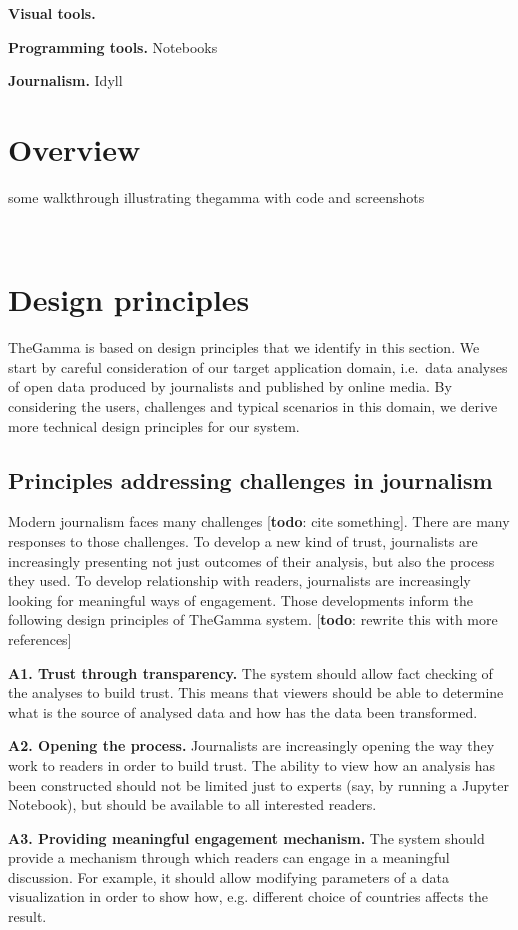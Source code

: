 \documentclass{sigchi}
\newcommand{\todo}[1]{\textcolor{todoColor}{[\textbf{todo}: #1]}}
\begin{document}
\textbf{Visual tools.}

\textbf{Programming tools.}
Notebooks

\textbf{Journalism.}
Idyll

\section{Overview}

some walkthrough illustrating thegamma with code and screenshots

\newpage
~
\newpage

\section{Design principles}
TheGamma is based on design principles that we identify in this section. We start by careful
consideration of our target application domain, i.e.~data analyses of open data produced by
journalists and published by online media. By considering the users, challenges and typical
scenarios in this domain, we derive more technical design principles for our system.

\subsection{Principles addressing challenges in journalism}
Modern journalism faces many challenges \todo{cite something}. There are many responses to those
challenges. To develop a new kind of trust, journalists are increasingly presenting not just
outcomes of their analysis, but also the process they used. To develop relationship with readers,
journalists are increasingly looking for meaningful ways of engagement. Those developments
inform the following design principles of TheGamma system. \todo{rewrite this with
more references}

\textbf{A1. Trust through transparency.} The system should allow fact checking of the analyses to
build trust. This means that viewers should be able to determine what is the source of analysed
data and how has the data been transformed.

\textbf{A2. Opening the process.} Journalists are increasingly opening the way they work
to readers in order to build trust. The ability to view how an analysis has been constructed should
not be limited just to experts (say, by running a Jupyter Notebook), but should be
available to all interested readers.

\textbf{A3. Providing meaningful engagement mechanism.} The system should provide a
mechanism through which readers can engage in a meaningful discussion. For example, it should allow
modifying parameters of a data visualization in order to show how, e.g. different choice of
countries affects the result.
\end{document}

